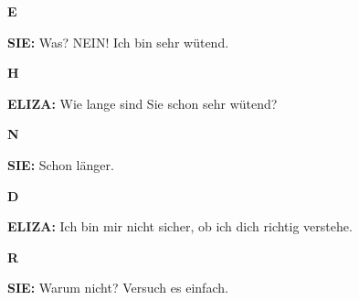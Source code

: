 \documentclass{article}
\begin{document}
\begin{minipage}[t]{0.13\textwidth}
  \centering
  {\bfseries\fontsize{14.4}{14.4}\selectfont\textcolor{pastelpink}{E}}
\end{minipage}%
\begin{minipage}[t]{0.81\textwidth}
  \textbf{SIE:} Was? NEIN! Ich bin sehr wütend.
\end{minipage}

\vspace{0.5cm}

\begin{minipage}[t]{0.13\textwidth}
  \centering
  {\bfseries\fontsize{14.4}{14.4}\selectfont\textcolor{pastelpink}{H}}
\end{minipage}%
\begin{minipage}[t]{0.81\textwidth}
  \textbf{ELIZA:} Wie lange sind Sie schon sehr wütend?
\end{minipage}

\vspace{0.5cm}

\begin{minipage}[t]{0.13\textwidth}
  \centering
  {\bfseries\fontsize{14.4}{14.4}\selectfont\textcolor{pastelpink}{N}}
\end{minipage}%
\begin{minipage}[t]{0.81\textwidth}
  \textbf{SIE:} Schon länger.
\end{minipage}

\vspace{0.5cm}

\begin{minipage}[t]{0.13\textwidth}
  \centering
  {\bfseries\fontsize{14.4}{14.4}\selectfont\textcolor{pastelpink}{D}}
\end{minipage}%
\begin{minipage}[t]{0.81\textwidth}
  \textbf{ELIZA:} Ich bin mir nicht sicher, ob ich dich richtig verstehe.
\end{minipage}

\vspace{0.5cm}

\begin{minipage}[t]{0.13\textwidth}
  \centering
  {\bfseries\fontsize{14.4}{14.4}\selectfont\textcolor{pastelpink}{R}}
\end{minipage}%
\begin{minipage}[t]{0.81\textwidth}
  \textbf{SIE:} Warum nicht? Versuch es einfach.
\end{minipage}

\vspace{0.5cm}
\end{document}
